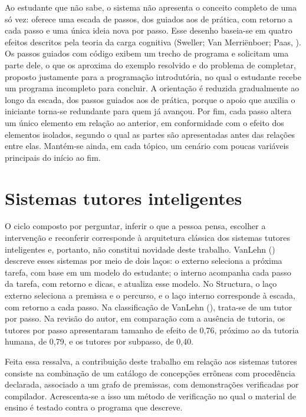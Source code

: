 Ao estudante que não sabe, o sistema não apresenta o conceito completo de uma só vez: oferece uma escada de passos, dos guiados aos de prática, com retorno a cada passo e uma única ideia nova por passo. Esse desenho baseia-se em quatro efeitos descritos pela teoria da carga cognitiva (Sweller; Van Merriënboer; Paas, \citeyear{sweller2019}). Os passos guiados com código exibem um trecho de programa e solicitam uma parte dele, o que os aproxima do exemplo resolvido e do problema de completar, proposto justamente para a programação introdutória, no qual o estudante recebe um programa incompleto para concluir. A orientação é reduzida gradualmente ao longo da escada, dos passos guiados aos de prática, porque o apoio que auxilia o iniciante torna-se redundante para quem já avançou. Por fim, cada passo altera um único elemento em relação ao anterior, em conformidade com o efeito dos elementos isolados, segundo o qual as partes são apresentadas antes das relações entre elas. Mantém-se ainda, em cada tópico, um cenário com poucas variáveis principais do início ao fim.

\section{Sistemas tutores inteligentes}

O ciclo composto por perguntar, inferir o que a pessoa pensa, escolher a intervenção e reconferir corresponde à arquitetura clássica dos sistemas tutores inteligentes e, portanto, não constitui novidade deste trabalho. VanLehn (\citeyear{vanlehn2006}) descreve esses sistemas por meio de dois laços: o externo seleciona a próxima tarefa, com base em um modelo do estudante; o interno acompanha cada passo da tarefa, com retorno e dicas, e atualiza esse modelo. No Structura, o laço externo seleciona a premissa e o percurso, e o laço interno corresponde à escada, com retorno a cada passo. Na classificação de VanLehn (\citeyear{vanlehn2011}), trata-se de um tutor por passo. Na revisão do autor, em comparação com a ausência de tutoria, os tutores por passo apresentaram tamanho de efeito de 0,76, próximo ao da tutoria humana, de 0,79, e os tutores por subpasso, de 0,40.

Feita essa ressalva, a contribuição deste trabalho em relação aos sistemas tutores consiste na combinação de um catálogo de concepções errôneas com procedência declarada, associado a um grafo de premissas, com demonstrações verificadas por compilador. Acrescenta-se a isso um método de verificação no qual o material de ensino é testado contra o programa que descreve.

